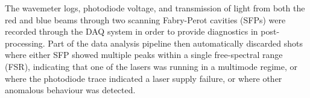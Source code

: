 	The wavemeter logs, photodiode voltage, and transmission of light from both the red and blue beams through two scanning Fabry-Perot cavities (SFPs) were recorded through the DAQ system in order to provide diagnostics in post-processing.
	Part of the data analysis pipeline then automatically discarded shots where either SFP showed multiple peaks within a single free-spectral range (FSR), indicating that one of the lasers was running in a multimode regime, or where the photodiode trace indicated a laser supply failure, or where other anomalous behaviour was detected.



